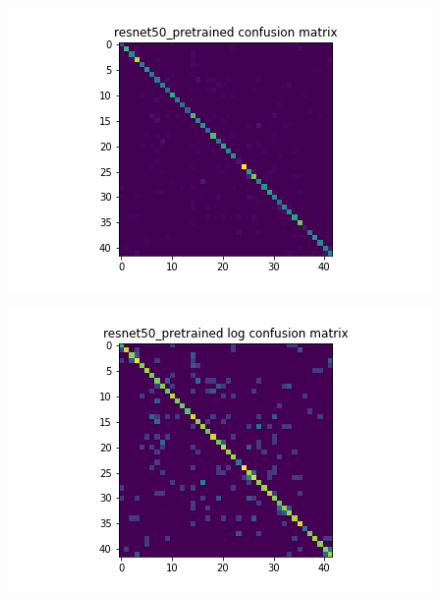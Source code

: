 \begin{figure}[t]
  \begin{minipage}[b]{.5\linewidth}
    \centering
    {\includegraphics[width=1.2\textwidth]{figs/conf_matrix/resnet50_pretrained_conf.png}}
  \end{minipage}
  \hfill
  \begin{minipage}[b]{.5\linewidth}
    \centering

    {\includegraphics[width=1.2\textwidth]{figs/conf_matrix/resnet50_pretrained_log_conf.png}}
  \end{minipage}
  \vfill
  \begin{minipage}[b]{.5\linewidth}
    \centering


\end{minipage}
\end{figure}
